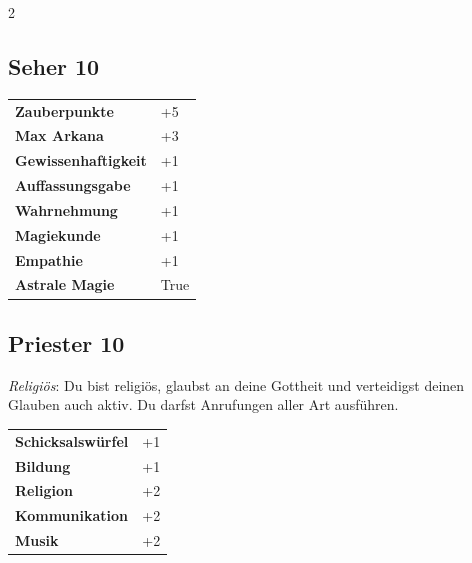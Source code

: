 \begin{multicols}{2}
\begin{tcolorbox}

\end{tcolorbox}

\begin{tcolorbox}
    \subsection*{Seher \hfill \small{10 }}
    \tcblower




\begin{tabular}{@{}ll@{}}
    \textbf{Zauberpunkte} & +5\\
    \textbf{Max Arkana} & +3\\
    \textbf{Gewissenhaftigkeit} & +1\\
    \textbf{Auffassungsgabe} & +1\\
    \textbf{Wahrnehmung} & +1\\
    \textbf{Magiekunde} & +1\\
    \textbf{Empathie} & +1\\
    \textbf{Astrale Magie} & True\\
\end{tabular}


\end{tcolorbox}

\begin{tcolorbox}
    \subsection*{Priester \hfill \small{10 }}
    \tcblower
\textit{Religiös}: Du bist religiös, glaubst an deine Gottheit und verteidigst deinen Glauben auch aktiv. Du darfst Anrufungen aller Art ausführen.


\vspace{3mm}

\begin{tabular}{@{}ll@{}}
    \textbf{Schicksalswürfel} & +1\\
    \textbf{Bildung} & +1\\
    \textbf{Religion} & +2\\
    \textbf{Kommunikation} & +2\\
    \textbf{Musik} & +2\\
\end{tabular}


\end{tcolorbox}
\end{multicols}
